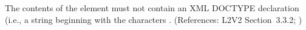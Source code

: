 The contents of the  element must not contain an XML
DOCTYPE declaration (i.e., a string beginning with the characters
.  (References: L2V2 Section~3.3.2;
)
